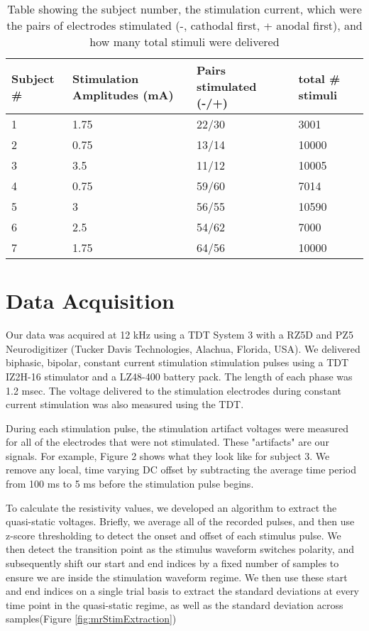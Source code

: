 \renewcommand{\tabcolsep}{1pt}
\renewcommand{\arraystretch}{0.7}
\begin{table}[ht]

	\begin{tabularx}{\textwidth}{@{}lXXX@{}}
		\toprule
		Subject \# & Stimulation Amplitudes (mA) & Pairs stimulated \newline (-/+) & total \# stimuli \\
		\midrule
		1  & 1.75 & 22/30 & 3001 \\
		2  & 0.75 & 13/14 & 10000 \\
		3  & 3.5 & 11/12 & 10005 \\
		4 & 0.75 & 59/60 & 7014 \\
		5 & 3 & 56/55 & 10590 \\
		6  & 2.5  & 54/62 & 7000 \\
		7  & 1.75  & 64/56 & 10000\\
		\bottomrule		
	\end{tabularx}
	\caption[Subject characteristics]{Table showing the subject number, the stimulation current, which were the pairs of electrodes stimulated (-, cathodal first, + anodal first), and how many total stimuli were delivered}
	\label{table:mrSubjs}
\end{table}


\section{Data Acquisition}

Our data was acquired at 12 kHz using a TDT System 3 with a RZ5D and PZ5 Neurodigitizer (Tucker Davis Technologies, Alachua, Florida, USA). We delivered biphasic, bipolar, constant current stimulation stimulation pulses using a TDT IZ2H-16 stimulator and a LZ48-400 battery pack. The length of each phase was 1.2 msec. The voltage delivered to the stimulation electrodes during constant current stimulation was also measured using the TDT. 

During each stimulation pulse, the stimulation artifact voltages were measured for all of the electrodes that were not stimulated. These "artifacts" are our signals. For example, Figure 2 shows what they look like for subject 3. We remove any local, time varying DC offset by subtracting the average time period from 100 ms to 5 ms before the stimulation pulse begins. 

To calculate the resistivity values, we developed an algorithm to extract the quasi-static voltages. Briefly, we average all of the recorded pulses, and then use z-score thresholding to detect the onset and offset of each stimulus pulse. We then detect the transition point as the stimulus waveform switches polarity, and subsequently shift our start and end indices by a fixed number of samples to ensure we are inside the stimulation waveform regime. We then use these start and end indices on a single trial basis to extract the standard deviations at every time point in the quasi-static regime, as well as the standard deviation across samples(Figure \ref{fig:mrStimExtraction})

